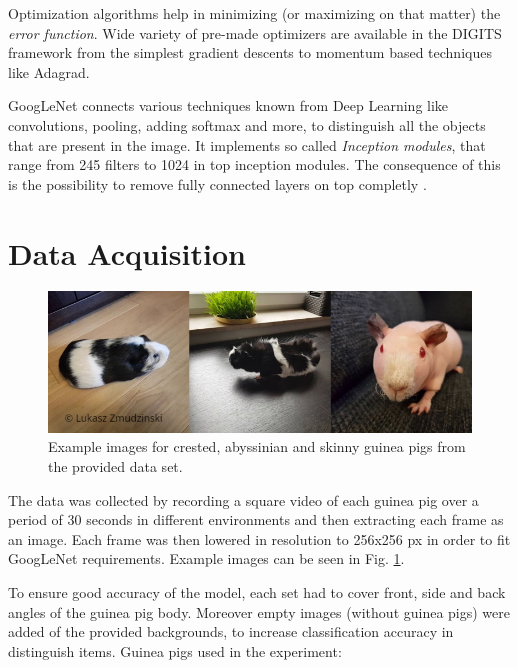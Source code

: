 \documentclass[10pt,journal,compsoc]{IEEEtran}
\begin{document}
    Optimization algorithms help in minimizing (or maximizing on that matter) the \textit{error function}. Wide variety of pre-made optimizers are available in the DIGITS framework from the simplest gradient descents to momentum based techniques like Adagrad\cite{adagrad}.

    GoogLeNet connects various techniques known from Deep Learning like convolutions, pooling, adding softmax and more\cite{fcn}, to distinguish all the objects that are present in the image. It implements so called \textit{Inception modules}, that range from 245 filters to 1024 in top inception modules. The consequence of this is the possibility to remove fully connected layers on top completly \cite{inception}.

    \section{Data Acquisition}

    \begin{figure}[h]
        \includegraphics[width=\linewidth]{pig_dataset.png}
        \caption{Example images for crested, abyssinian and skinny guinea pigs from the provided data set.}
        \label{fig:pigs}
        \centering
    \end{figure}

    The data was collected by recording a square video of each guinea pig over a period of 30 seconds in different environments and then extracting each frame as an image. Each frame was then lowered in resolution to 256x256 px in order to fit GoogLeNet requirements. Example images can be seen in Fig. \ref{fig:pigs}.

    To ensure good accuracy of the model, each set had to cover front, side and back angles of the guinea pig body. Moreover empty images (without guinea pigs) were added of the provided backgrounds, to increase classification accuracy in distinguish items.
    \newline\newline
    Guinea pigs used in the experiment:
\end{document}
